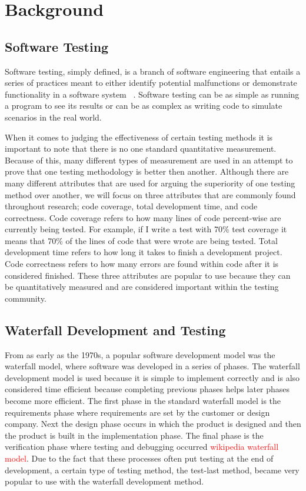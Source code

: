 \documentclass{sig-alternate}
\newcommand{\mycomment}[1]{\textcolor{red}{#1}}
\begin{document}
\section{Background}
\subsection{Software Testing}
Software testing, simply defined, is a branch of software engineering that entails a series of practices meant to either identify potential malfunctions or demonstrate functionality in a software system ~\cite{Bertolino:2007}.  Software testing can be as simple as running a program to see its results or can be as complex as writing code to simulate scenarios in the real world.

When it comes to judging the effectiveness of certain testing methods it is important to note that there is no one standard quantitative measurement.  Because of this, many different types of measurement are used in an attempt to prove that one testing methodology is better then another.  Although there are many different attributes that are used for arguing the superiority of one testing method over another, we will focus on three attributes that are commonly found throughout research; code coverage, total development time, and code correctness.  Code coverage refers to how many lines of code percent-wise are currently being tested. For example, if I write a test with 70\% test coverage it means that 70\% of the lines of code that were wrote are being tested.  Total development time refers to how long it takes to finish a development project.  Code correctness refers to how many errors are found within code after it is considered finished.  These three attributes are popular to use because they can be quantitatively measured and are considered important within the testing community. 

\subsection{Waterfall Development and Testing}

From as early as the 1970s, a popular software development model was the waterfall model, where software was developed in a series of phases.  The waterfall development model is used because it is simple to implement correctly and is also considered time efficient because completing previous phases helps later phases become more efficient. The first phase in the standard waterfall model is the requirements phase where requirements are set by the customer or design company.  Next the design phase occurs in which the product is designed and then the product is built in the implementation phase.  The final phase is the verification phase where testing and debugging occurred \mycomment{wikipedia waterfall model}.  Due to the fact that these processes often put testing at the end of development, a certain type of testing method, the test-last method, became very popular to use with the waterfall development method.
\end{document}
